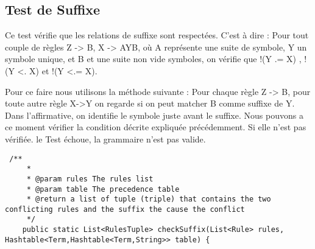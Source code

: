 	\subsection{Test de Suffixe}
		Ce test vérifie que les relations de suffixe sont respectées. C'est à dire :
		Pour tout couple de règles Z -> B, X -> AYB, où A représente une suite de symbole, Y un symbole unique,
		et B et une suite non vide symboles, on vérifie que !(Y .= X) , !(Y <. X) et !(Y <.= X).
		
		Pour ce faire nous utilisons la méthode suivante : 
		Pour chaque règle Z -> B, pour toute autre règle X->Y on regarde si on peut matcher B comme suffixe de Y.
		Dans l'affirmative, on identifie le symbole juste avant le suffixe. Nous pouvons a ce moment vérifier la
		condition décrite expliquée précédemment. Si elle n'est pas vérifiée. le Test échoue, la grammaire n'est pas valide.


\begin{verbatim}
 /**
	 * 
	 * @param rules The rules list
	 * @param table The precedence table
	 * @return a list of tuple (triple) that contains the two conflicting rules and the suffix the cause the conflict
	 */
	public static List<RulesTuple> checkSuffix(List<Rule> rules, Hashtable<Term,Hashtable<Term,String>> table) {
\end{verbatim}
